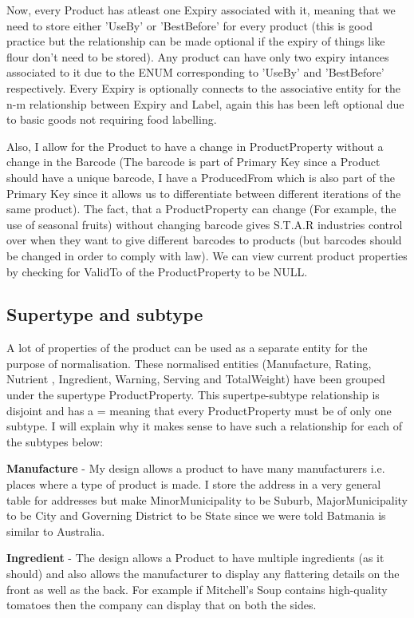 Now, every Product has atleast one Expiry associated with it, meaning that we need to store either 'UseBy' or 'BestBefore' for every product (this is good practice but the relationship can be made optional if the expiry of things like flour don't need to be stored). Any product can have only two expiry intances associated to it due to the ENUM corresponding to 'UseBy' and 'BestBefore' respectively. Every Expiry is optionally connects to the associative entity for the n-m relationship between Expiry and Label, again this has been left optional due to basic goods not requiring food labelling. 

Also, I allow for the Product to have a change in ProductProperty without a change in the Barcode (The barcode is part of Primary Key since a Product should have a unique barcode, I have a ProducedFrom which is also part of the Primary Key since it allows us to differentiate between different iterations of the same product). The fact, that a ProductProperty can change (For example, the use of seasonal fruits) without changing barcode gives S.T.A.R industries control over when they want to give different barcodes to products (but barcodes should be changed in order to comply with law). We can view current product properties by checking for ValidTo of the ProductProperty to be NULL. 

\subsection{Supertype and subtype}

A lot of properties of the product can be used as a separate entity for the purpose of normalisation. These normalised entities (Manufacture, Rating, Nutrient , Ingredient, Warning, Serving and TotalWeight) have been grouped under the supertype ProductProperty. This supertpe-subtype relationship is disjoint and has a = meaning that every ProductProperty must be of only one subtype. I will explain why it makes sense to have such a relationship for each of the subtypes below:

{\bf Manufacture} - My design allows a product to have many manufacturers i.e. places where a type of product is made. I store the address in a very general table for addresses but make MinorMunicipality to be Suburb, MajorMunicipality to be City and Governing District to be State since we were told Batmania is similar to Australia. 

{\bf Ingredient} - The design allows a Product to have multiple ingredients (as it should) and also allows the manufacturer to display any flattering details on the front as well as the back. For example if Mitchell's Soup contains high-quality tomatoes then the company can display that on both the sides. 

